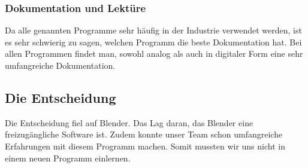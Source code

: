 \subsubsection{Dokumentation und Lektüre}
Da alle genannten Programme sehr häufig in der Industrie verwendet werden, ist es sehr schwierig zu sagen, welchen Programm die beste Dokumentation hat. Bei allen Programmen findet man, sowohl analog als auch in digitaler Form eine sehr umfangreiche Dokumentation.

\subsection{Die Entscheidung}
Die Entscheidung fiel auf Blender. Das Lag daran, das Blender eine freizugängliche Software ist. Zudem konnte unser Team schon umfangreiche Erfahrungen mit diesem Programm machen. Somit mussten wir uns nicht in einem neuen Programm einlernen.